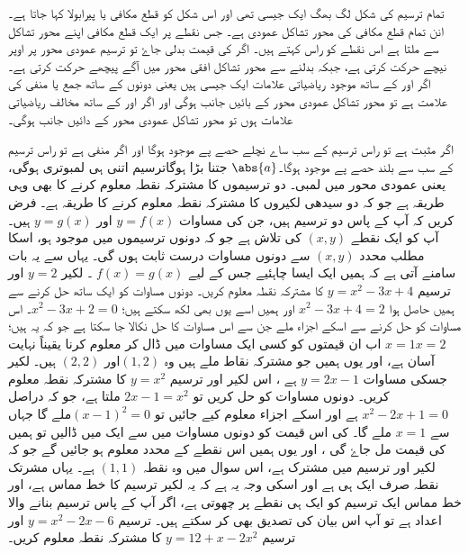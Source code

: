 تمام ترسیم کی شکل لگ بھگ ایک جیسی تھی اور اس شکل کو قطع مکافی یا پیرابولا کہا جاتا ہے۔ انن تمام قطع مکافی کی محور تشاکل عمودی ہے۔ جس نقطے پر ایک قطع مکافی اپنے محور تشاکل سے ملتا ہے اس نقطے کو راس کہتے ہیں۔ اگر   کی قیمت بدلی جاۓ تو ترسیم عمودی محور پر اوپر نیچے حرکت کرتی ہے، جبکہ   بدلنے سے محور تشاکل افقی محور میں آگے پیچھے حرکت کرتی ہے۔ اگر   اور  کے ساتھ موجود ریاضیاتی علامات ایک جیسی ہیں یعنی دونوں کے ساتھ جمع یا منفی کی علامت ہے تو محور تشاکل عمودی محور کے بائیں جانب ہوگی اور اگر   اور  کے ساتھ مخالف ریاضیاتی علامات ہوں تو محور تشاکل عمودی محور کے دائیں جانب ہوگی۔

اگر  مثبت ہے تو راس ترسیم کے سب ساے نچلے حصے پے موجود ہوگا اور اگر  منفی ہے تو راس ترسیم کے سب سے بلند حصے پے موجود ہوگا۔\(\abs{a}\)  جتنا بڑا ہوگاترسیم اتنی ہی لمبوتری ہوگی، یعنی عمودی محور میں لمبی۔
دو ترسیموں کا مشترکہ نقطہ معلوم کرنے کا بھی وہی طریقہ ہے جو کہ دو سیدھی لکیروں کا مشترکہ نقطہ معلوم کرنے کا طریقہ ہے۔ فرض کریں کہ آپ کے پاس دو ترسیم ہیں، جن کی مساوات \(    y=f(x)        \)  اور \(    y=g(x)       \) ہیں۔ آپ کو ایک نقطے \(   (x,y)    \)  کی تلاش ہے جو کہ دونوں ترسیموں میں موجود ہو، اسکا مطلب محدد \(   (x,y)    \) سے دونوں مساوات درست ثابت ہوں گی۔ یہاں سے یہ بات سامنے آتی ہے کہ ہمیں ایک ایسا  چاہئیے جس کے لیے \(   f(x)=g(x)  \) ۔
لکیر \(  y=2\) اور ترسیم \(  y=x^{2}-3x+4\) کا مشترکہ نقطہ معلوم کریں۔
دونوں مساوات کو ایک ساتھ حل کرنے سے ہمیں حاصل ہوا \(  x^{2}-3x+4=2\) اور ہمیں اسے یوں بھی لکھ سکتے ہیں؛ \(  x^{2}-3x+2=0 \)۔
اس مساوات کو حل کرنے سے اسکے اجزاء ملے جن سے اس مساوات کا حل نکالا جا سکتا ہے جو کہ یہ ہیں؛ \(x=1   x=2\) اب ان قیمتوں کو کسی ایک مساوات میں ڈال کر  معلوم کرنا یقیناً نہایت آسان ہے، اور یوں ہمیں جو مشترکہ نقاط ملے ہیں وہ \(    (1,2)  \)اور \(     (2,2)  \) ہیں۔
لکیر جسکی مساوات \( y=2x-1 \) ہے ، اس لکیر اور ترسیم \(   y=x^{2} \) کا مشترکہ نقطہ معلوم کریں۔
دونوں مساوات کو حل کریں تو \(   2x-1=x^{2} \) ملتا ہے، جو کہ دراصل \(    x^{2}-2x+1=0 \) ہے اور اسکے اجزاء معلوم کیے جائیں تو \(   (x-1)^{2}=0  \)ملے گا جہاں سے \(     x=1  \) ملے گا۔
 کی اس قیمت کو دونوں مساوات میں سے ایک میں ڈالیں تو ہمیں  کی قیمت مل جاۓ گی ، اور یوں ہمیں اس نقطے کے محدد معلوم ہو جائیں گے جو کہ لکیر اور ترسیم میں مشترک ہے، اس سوال میں وہ نقطہ \((1,1)\) ہے۔ 
یہاں مشرتک نقطہ صرف ایک ہی ہے اور اسکی وجہ یہ ہے کہ یہ لکیر ترسیم کا خط مماس ہے، اور خط مماس ایک ترسیم کو ایک ہی نقطے پر چھوتی ہے، اگر آپ کے پاس ترسیم بنانے والا اعداد ہے تو آپ اس بیان کی تصدیق بھی کر سکتے ہیں۔
ترسیم \(   y=x^{2}-2x-6  \) اور  ترسیم \(   y=12+x-2x^{2}  \) کا مشترکہ نقطہ معلوم کریں۔


